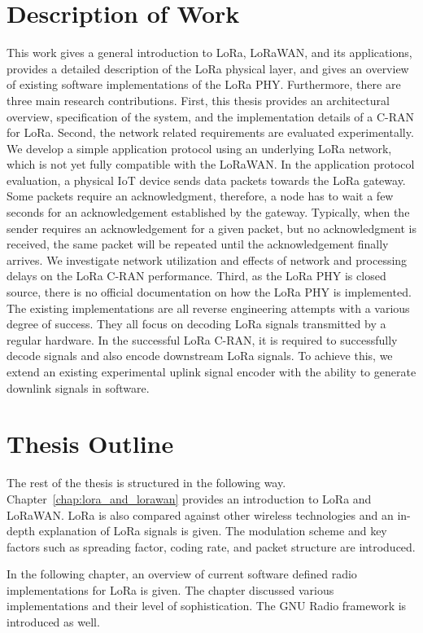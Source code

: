 \section{Description of Work}
This work gives a general introduction to LoRa, LoRaWAN, and its applications, provides a detailed description of the LoRa physical layer, and gives an overview of existing software implementations of the LoRa PHY. 
Furthermore, there are three main research contributions. 
First, this thesis provides an architectural overview, specification of the system, and the implementation details of a C-RAN for LoRa.
Second, the network related requirements are evaluated experimentally. 
We develop a simple application protocol using an underlying LoRa network, which is not yet fully compatible with the LoRaWAN. 
In the application protocol evaluation, a physical IoT device sends data packets towards the LoRa gateway.
Some packets require an acknowledgment, therefore, a node has to wait a few seconds for an acknowledgement established by the gateway.
Typically, when the sender requires an acknowledgement for a given packet, but no acknowledgment is received, the same packet will be repeated until the acknowledgement finally arrives.
We investigate network utilization and effects of network and processing delays on the LoRa C-RAN performance.
Third, as the LoRa PHY is closed source, there is no official documentation on how the LoRa PHY is implemented.
The existing implementations are all reverse engineering attempts with a various degree of success. 
They all focus on decoding LoRa signals transmitted by a regular hardware. 
In the successful LoRa C-RAN, it is required to successfully decode signals and also encode downstream LoRa signals. 
To achieve this, we extend an existing experimental uplink signal encoder with the ability to generate downlink signals in software.

\section{Thesis Outline}
The rest of the thesis is structured in the following way.
Chapter~\ref{chap:lora_and_lorawan} provides an introduction to LoRa and LoRaWAN.
LoRa is also compared against other wireless technologies and an in-depth explanation of LoRa signals is given. 
The modulation scheme and key factors such as spreading factor, coding rate, and packet structure are introduced.

In the following chapter, an overview of current software defined radio implementations for LoRa is given.
The chapter discussed various implementations and their level of sophistication. 
The GNU Radio framework is introduced as well.

